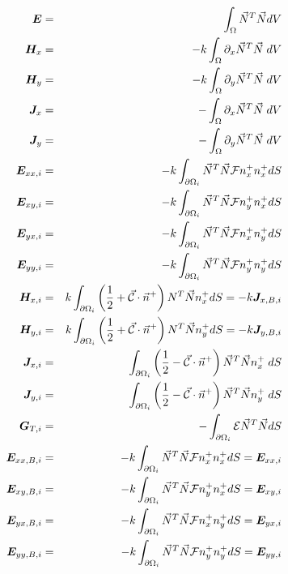 \begin{footnotesize}
\begin{eqnarray}
{\bm E} &=& \int_\Omega \vec{N}^T \vec{N} dV \\
{\bm H}_x &=&   -k\int_\Omega  \partial_x \vec{N}^T \vec{N} \; dV     \\ 
{\bm H}_y &=&   -k\int_\Omega  \partial_y \vec{N}^T \vec{N} \; dV     \\ 
{\bm J}_x &=&   -\int_\Omega  \partial_x \vec{N}^T \vec{N} \; dV     \\ 
{\bm J}_y &=&   -\int_\Omega  \partial_y \vec{N}^T \vec{N} \; dV     \\ 
{\bm E}_{xx,i} &=&   -k\int_{\partial\Omega_i}  \vec{N}^T\vec{N}  {\cal F} {n}^+_x   n^+_x dS  \\
{\bm E}_{xy,i} &=&   -k\int_{\partial\Omega_i}  \vec{N}^T\vec{N}  {\cal F} {n}^+_y   n^+_x dS  \\
{\bm E}_{yx,i} &=&   -k\int_{\partial\Omega_i}  \vec{N}^T\vec{N}  {\cal F} {n}^+_x   n^+_y dS  \\
{\bm E}_{yy,i} &=&   -k\int_{\partial\Omega_i}  \vec{N}^T\vec{N}  {\cal F} {n}^+_y   n^+_y dS  \\
{\bm H}_{x,i} &=&     k\int_{\partial\Omega_i}  \left( \frac{1}{2} + \vec{\cal C} \cdot \vec{n}^+ \right) {N}^T \vec{N} n^+_x dS = -k {\bm J}_{x,B,i}\\
{\bm H}_{y,i} &=&     k\int_{\partial\Omega_i}  \left( \frac{1}{2} + \vec{\cal C} \cdot \vec{n}^+ \right) {N}^T \vec{N} n^+_y dS = -k {\bm J}_{y,B,i}\\
{\bm J}_{x,i} &=&    \int_{\partial\Omega_i}  \left(\frac{1}{2} - \vec{\cal{C}} \cdot \vec{n}^+ \right) \vec{N}^T \vec{N} n^+_x  \; dS  \\
{\bm J}_{y,i} &=&    \int_{\partial\Omega_i}  \left(\frac{1}{2} - \vec{\cal{C}} \cdot \vec{n}^+ \right) \vec{N}^T \vec{N} n^+_y  \; dS  \\
{\bm G}_{T,i} &=&   -\int_{\partial\Omega_i}   {\cal{E}}   \vec{N}^T \vec{N} dS  \\
{\bm E}_{xx,B,i} &=&    -k\int_{\partial\Omega_i}  \vec{N}^T\vec{N}  {\cal F} {n}^+_x   n^+_x dS = {\bm E}_{xx,i} \\
{\bm E}_{xy,B,i} &=&    -k\int_{\partial\Omega_i}  \vec{N}^T\vec{N}  {\cal F} {n}^+_y   n^+_x dS = {\bm E}_{xy,i} \\
{\bm E}_{yx,B,i} &=&    -k\int_{\partial\Omega_i}  \vec{N}^T\vec{N}  {\cal F} {n}^+_x   n^+_y dS = {\bm E}_{yx,i} \\
{\bm E}_{yy,B,i} &=&    -k\int_{\partial\Omega_i}  \vec{N}^T\vec{N}  {\cal F} {n}^+_y   n^+_y dS = {\bm E}_{yy,i} \\

\end{eqnarray}
\end{footnotesize}
